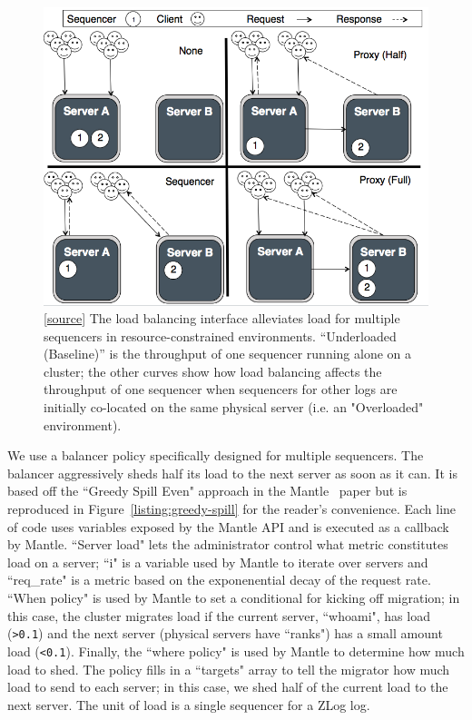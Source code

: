 \documentclass[preprint]{sigplanconf-eurosys}
\begin{document}
\begin{figure}[t!]
\centering
\includegraphics{figures/mantle-modes.png}
\caption{[\href{https://github.com/double-blind-submitter/osdi16}{source}] The
load balancing interface alleviates load for multiple sequencers in
resource-constrained environments.  ``Underloaded (Baseline)'' is the
throughput of one sequencer running alone on a cluster; the other curves show
how load balancing affects the throughput of one sequencer when sequencers for
other logs are initially co-located on the same physical server (i.e. an
"Overloaded" environment).}\label{fig:mantle-seq-thruput}
\end{figure}


We use a balancer policy specifically designed for multiple sequencers. The
balancer aggressively sheds half its load to the next server as soon as it can.
It is based off the ``Greedy Spill Even" approach in the
Mantle~\cite{sevilla:sc15-mantle} paper but is reproduced in
Figure~\ref{listing:greedy-spill} for the reader's convenience. Each line of
code uses variables exposed by the Mantle API and is executed as a callback by
Mantle.  ``Server load" lets the administrator control what metric constitutes
load on a server; ``i" is a variable used by Mantle to iterate over servers and
``req\_rate" is a metric based on the exponenential decay of the request rate.
``When policy" is used by Mantle to set a conditional for kicking off migration;
in this case, the cluster migrates load if the current server, ``whoami", has
load (\texttt{>0.1}) and the next server (physical servers have ``ranks") has a
small amount load (\texttt{<0.1}). Finally, the ``where policy" is used by
Mantle to determine how much load to shed. The policy fills in a ``targets"
array to tell the migrator how much load to send to each server; in this case,
we shed half of the current load to the next server. The unit of load is a
single sequencer for a ZLog log.
\end{document}
